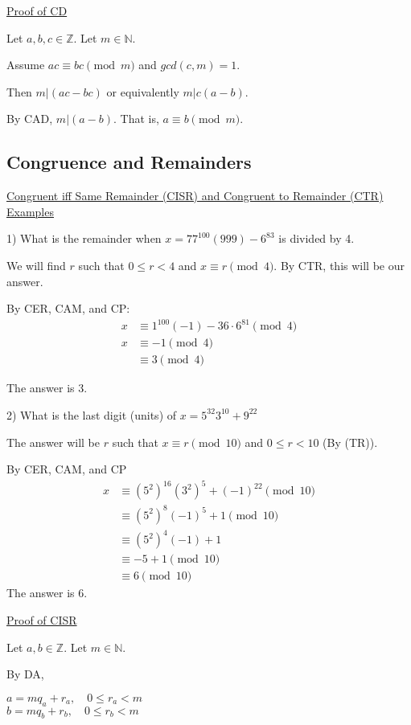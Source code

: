 \documentclass{article}
\begin{document}
\underline{Proof of CD}

Let $a,b,c \in \mathbb{Z}$. Let $m \in \mathbb{N}$.

Assume $ac \equiv bc \pmod{m}$ and $gcd(c,m)=1$.

Then $m \vert (ac - bc)$ or equivalently $m \vert c(a-b)$. 

By CAD, $m \vert (a-b)$. That is, $a \equiv b \pmod{m}$.

\subsection{Congruence and Remainders}

\underline{Congruent iff Same Remainder (CISR) and Congruent to Remainder (CTR) Examples}

1) What is the remainder when $x = 77^{100}(999)-6^{83}$ is divided by 4. 

We will find $r$ such that $0 \le r < 4$ and $x \equiv r \pmod{4}$. By CTR, this will be our answer. 

By CER, CAM, and CP:
\begin{align*}
    x &\equiv 1^{100}(-1) - 36 \cdot 6^{81} \pmod{4} \\
    x &\equiv -1 \pmod{4} \\
    &\equiv 3 \pmod{4}
\end{align*}

The answer is 3. 

2) What is the last digit (units) of $x = 5^{32}3^{10}+9^{22}$

The answer will be $r$ such that $x \equiv r \pmod{10}$ and $0 \le r < 10$ (By (TR)). 

By CER, CAM, and CP
\begin{align*}
    x &\equiv (5^2)^{16} (3^2)^5 + (-1)^{22} \pmod{10} \\
    &\equiv (5^2)^8(-1)^5 + 1 \pmod{10} \\
    &\equiv (5^2)^4(-1)+1 \\
    &\equiv -5 + 1 \pmod{10} \\
    &\equiv 6 \pmod{10}
\end{align*}
The answer is 6.

\underline{Proof of CISR}

Let $a,b \in \mathbb{Z}$. Let $m \in \mathbb{N}$. 

By DA,

$a = mq_a + r_a, \quad 0 \le r_a < m$\\
$b = mq_b + r_b, \quad 0 \le r_b < m$
\end{document}
